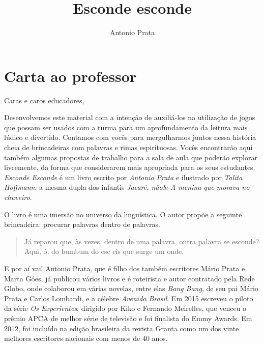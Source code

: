 \documentclass[11pt]{extarticle}
\newcommand{\AutorLivro}{Antonio Prata}
\newcommand{\TituloLivro}{Esconde esconde}
\newcommand{\colaborador}{Gabriela Karam}
\begin{document}
\title{\TituloLivro}
\author{\AutorLivro}
\def\authornotes{\colaborador}

\date{}
\maketitle


\tableofcontents

\section{Carta ao professor}

Caras e caros educadores,

Desenvolvemos este material com a intenção de auxiliá-los na utilização de jogos que possam ser usados com a turma para um aprofundamento da leitura mais lúdico e divertido. Contamos com vocês para mergulharmos juntos nessa história cheia de brincadeiras com palavras e rimas espirituosas. Vocês encontrarão aqui também algumas propostas de trabalho para a sala de aula que poderão explorar livremente, da forma que considerarem mais apropriada para os seus estudantes. \textit{Esconde Esconde} é um livro escrito por \textit{Antonio Prata} e ilustrado por \textit{Talita Hoffmann}, a mesma dupla dos infantis \textit{Jacaré, não!}e \textit{A menina que morava no chuveiro}. 


O livro é uma imersão no universo da linguística. O autor propõe a seguinte brincadeira: procurar palavras dentro de palavras.

\begin{quote}

Já reparou que, às vezes, dentro de uma palavra, outra palavra se esconde? Aqui, ó, do bumbum do esc eis que surge um onde. 


\end{quote}

E por aí vai! Antonio Prata, que é  filho dos também escritores Mário Prata e Marta Góes, já publicou vários livros e é roteirista e autor contratado pela Rede Globo, onde colaborou em várias novelas, entre elas \textit{Bang Bang}, de seu pai Mário Prata e Carlos Lombardi, e a célebre \textit{Avenida Brasil}. Em 2015 escreveu o piloto da série \textit{Os Experientes}, dirigido por Kiko e Fernando Meirelles, que venceu o prêmio APCA de melhor série de televisão e foi finalista do Emmy Awards. Em 2012, foi incluído na edição brasileira da revista Granta como um dos vinte melhores escritores nacionais com menos de 40 anos.
\end{document}
